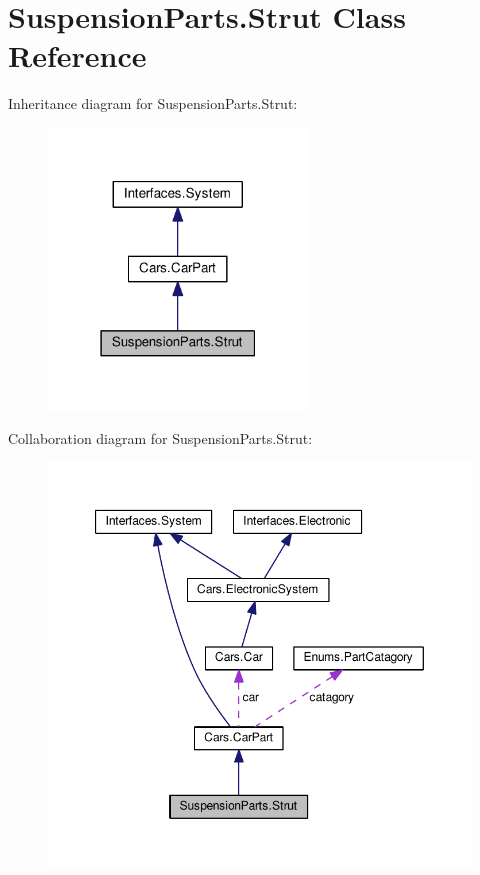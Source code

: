 \hypertarget{classSuspensionParts_1_1Strut}{}\section{Suspension\+Parts.\+Strut Class Reference}
\label{classSuspensionParts_1_1Strut}


Inheritance diagram for Suspension\+Parts.\+Strut\+:\nopagebreak
\begin{figure}[H]
\begin{center}
\leavevmode
\includegraphics[width=195pt]{classSuspensionParts_1_1Strut__inherit__graph}
\end{center}
\end{figure}


Collaboration diagram for Suspension\+Parts.\+Strut\+:\nopagebreak
\begin{figure}[H]
\begin{center}
\leavevmode
\includegraphics[width=350pt]{classSuspensionParts_1_1Strut__coll__graph}
\end{center}
\end{figure}
